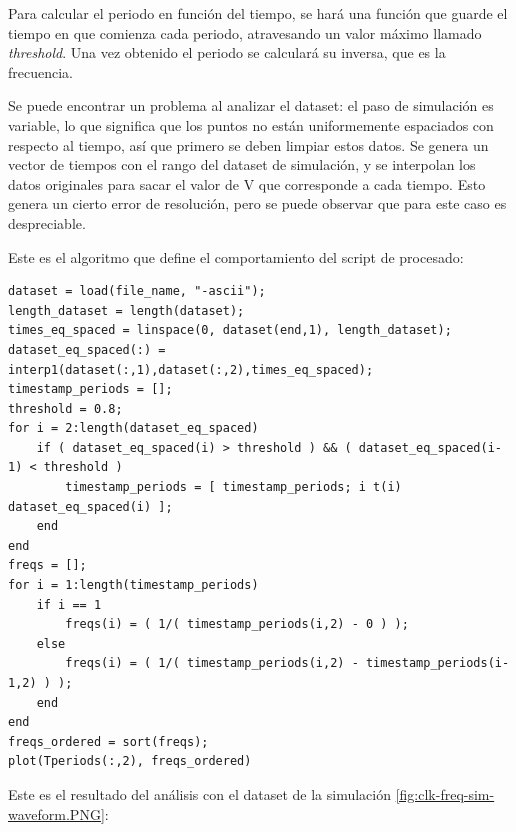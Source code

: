 \documentclass[12pt]{report} %
\begin{document}
	Para calcular el periodo en función del tiempo, se hará una función que guarde el tiempo en que comienza cada periodo, atravesando un valor máximo llamado \textit{threshold}. Una vez obtenido el periodo se calculará su inversa, que es la frecuencia.
	
	Se puede encontrar un problema al analizar el dataset: el paso de simulación es variable, lo que significa que los puntos no están uniformemente espaciados con respecto al tiempo, así que primero se deben limpiar estos datos. Se genera un vector de tiempos con el rango del dataset de simulación, y se interpolan los datos originales para sacar el valor de V que corresponde a cada tiempo. Esto genera un cierto error de resolución, pero se puede observar que para este caso es despreciable.
	
	Este es el algoritmo que define el comportamiento del script de procesado:
	
	\begin{lstlisting}[caption={Código en Matlab/Octave para procesar la forma de onda del reloj de frecuencia variable},label={lst:code-clk-var}]
dataset = load(file_name, "-ascii");
length_dataset = length(dataset);
times_eq_spaced = linspace(0, dataset(end,1), length_dataset);
dataset_eq_spaced(:) = interp1(dataset(:,1),dataset(:,2),times_eq_spaced);
timestamp_periods = [];
threshold = 0.8;
for i = 2:length(dataset_eq_spaced)
	if ( dataset_eq_spaced(i) > threshold ) && ( dataset_eq_spaced(i-1) < threshold )
		timestamp_periods = [ timestamp_periods; i t(i) dataset_eq_spaced(i) ];
	end
end
freqs = [];
for i = 1:length(timestamp_periods)
	if i == 1
		freqs(i) = ( 1/( timestamp_periods(i,2) - 0 ) );
	else
		freqs(i) = ( 1/( timestamp_periods(i,2) - timestamp_periods(i-1,2) ) );
	end
end
freqs_ordered = sort(freqs);
plot(Tperiods(:,2), freqs_ordered)
	\end{lstlisting} 

	Este es el resultado del análisis con el dataset de la simulación \ref{fig:clk-freq-sim-waveform.PNG}:
	
\end{document}
